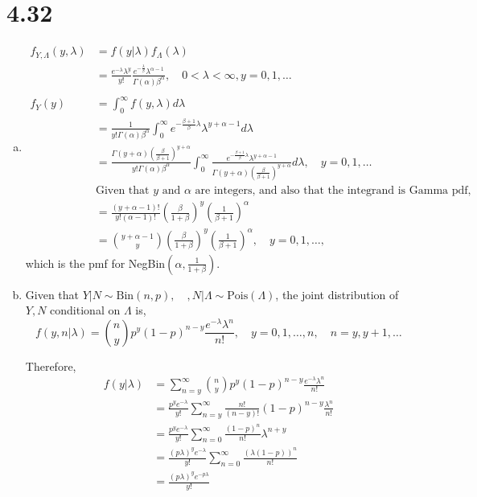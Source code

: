 \documentclass[letterpaper]{article}
\newcommand{\intzi}{\int_0^\infty}
\begin{document}
    \section*{4.32}
    \begin{enumerate}[(a)]
    	\item
    	\begin{align*}
    	f_{Y, \Lambda}(y, \lambda) &= f(y|\lambda)f_\Lambda(\lambda) \\
    	& = \frac{e^{-\lambda} \lambda^y}{y!} \frac{e^{-\frac{\lambda}{\beta}} \lambda^{\alpha-1}}{\Gamma(\alpha)\beta^\alpha}, \quad 0 < \lambda < \infty, y = 0, 1, \dots\\
    	\\
    	f_Y(y) &= \intzi f(y, \lambda) d\lambda \\
    	& = \frac{1}{y! \Gamma(\alpha) \beta^\alpha} \intzi e^{-\frac{\beta+1}{\beta} \lambda} \lambda^{y+\alpha-1} d\lambda \\
    	& = \frac{\Gamma(y+\alpha)\left(\frac{\beta}{\beta+1}\right)^{y+\alpha}}{y!\Gamma(\alpha) \beta^\alpha} \intzi \frac{e^{-\frac{\beta+1}{\beta} \lambda} \lambda^{y+\alpha-1}}{\Gamma(y+\alpha)\left(\frac{\beta}{\beta+1}\right)^{y+\alpha}} d\lambda, \quad y = 0, 1, \dots\\
    	& \text{Given that $y$ and $\alpha$ are integers, and also that the integrand is Gamma pdf,} \\ 
    	& = \frac{(y+\alpha-1)!}{y!(\alpha-1)!} \left(\frac{\beta}{1+\beta}\right)^y \left(\frac{1}{\beta+1}\right)^\alpha \\
    	& = \binom{y+\alpha-1}{y} \left(\frac{\beta}{1+\beta}\right)^y \left(\frac{1}{\beta+1}\right)^\alpha, \quad y = 0, 1, \dots, 
    	\end{align*}
    	which is the pmf for NegBin$(\alpha, \frac{1}{1+\beta})$.
    	\item Given that $Y|N \sim \text{Bin}(n, p), \quad, N|\Lambda \sim \text{Pois}(\Lambda)$, the joint distribution of $Y, N$ conditional on $\Lambda$ is,
        \[
        f(y, n|\lambda) = \binom{n}{y} p^y(1-p)^{n-y} \frac{e^{-\lambda}\lambda^n}{n!}, \quad y = 0, 1, \dots, n, \quad n = y, y + 1, \dots
        \]

        Therefore,
        \begin{align*}
        f(y|\lambda) & = \sum_{n=y}^\infty \binom{n}{y}p^y(1-p)^{n-y} \frac{e^{-\lambda}\lambda^n}{n!} \\
        & = \frac{p^y e^{-\lambda}}{y!} \sum_{n=y}^\infty \frac{n!}{(n-y)!} (1-p)^{n-y} \frac{\lambda^n}{n!} \\
        & = \frac{p^y e^{-\lambda}}{y!} \sum_{n=0}^\infty \frac{(1-p)^n}{n!} \lambda^{n+y} \\
        & = \frac{(p\lambda)^y e^{-\lambda}}{y!} \sum_{n=0}^\infty \frac{\left(\lambda(1-p)\right)^n}{n!} \\
        & = \frac{(p\lambda)^y e^{-p\lambda}}{y!}
        \end{align*}
        

\end{enumerate}
\end{document}
